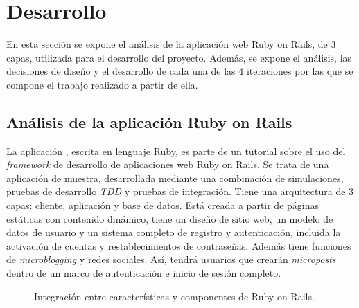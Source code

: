 \chapter{Desarrollo}
\label{cha:regulation}

En esta sección se expone el análisis de la aplicación web Ruby on Rails, de 3 capas, utilizada para el desarrollo del proyecto. Además, se expone el análisis, las decisiones de diseño y el desarrollo de cada una de las 4 iteraciones por las que se compone el trabajo realizado a partir de ella.

\section{Análisis de la aplicación Ruby on Rails}

La aplicación , escrita en lenguaje Ruby, es parte de un tutorial sobre el uso del \textit{framework} de desarrollo de aplicaciones web Ruby on Rails. Se trata de una aplicación de muestra, desarrollada mediante una combinación de simulaciones, pruebas de desarrollo \textit{TDD} y pruebas de integración. Tiene una arquitectura de 3 capas: cliente, aplicación y base de datos. Está creada a partir de páginas estáticas con contenido dinámico, tiene un diseño de sitio web, un modelo de datos de usuario y un sistema completo de registro y autenticación, incluida la activación de cuentas y restablecimientos de contraseñas. Además tiene funciones de \textit{microblogging} y redes sociales. Así, tendrá usuarios que crearán \textit{microposts} dentro de un marco de autenticación e inicio de sesión completo.

\begin{figure}[H]
\caption{Integración entre características y componentes de Ruby on Rails.\label{fig:figure_placement_example}}
\end{figure}

